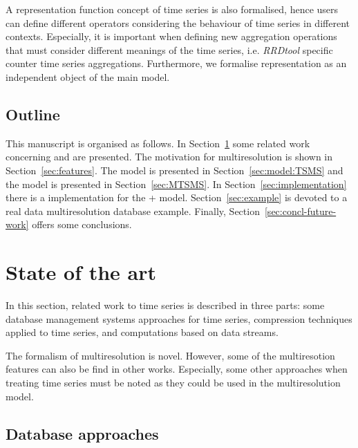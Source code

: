 A representation function concept of time series is also formalised, hence
users can define different operators considering the behaviour of time
series in different contexts. Especially, it is important when defining
new aggregation operations that must consider different meanings of
the time series, i.e. \emph{RRDtool} specific counter time series
aggregations. Furthermore, we formalise representation as an
independent object of the main model.




\subsection{Outline}

This manuscript is organised as follows.  In
Section~\ref{sec:related-work} some related work concerning
 and  are presented.  The motivation for
multiresolution is shown in Section~\ref{sec:features}.  The
 model is presented in Section~\ref{sec:model:TSMS} and the
 model is presented in Section~\ref{sec:MTSMS}.  In
Section~\ref{sec:implementation} there is a implementation
for the + model.  Section~\ref{sec:example} is
devoted to a real data multiresolution database example.  Finally,
Section~\ref{sec:concl-future-work} offers some conclusions.





\section{State of the art}
\label{sec:related-work}

In this section, related work to time series is
described in three parts: some database management systems
approaches for time series, compression techniques applied to time
series, and computations based on data streams.

The formalism of multiresolution is novel. However, some of the
multiresotion features can also be find in other works.  Especially,
some other approaches when treating time series must be noted as they
could be used in the multiresolution model.  


\subsection{Database approaches}

